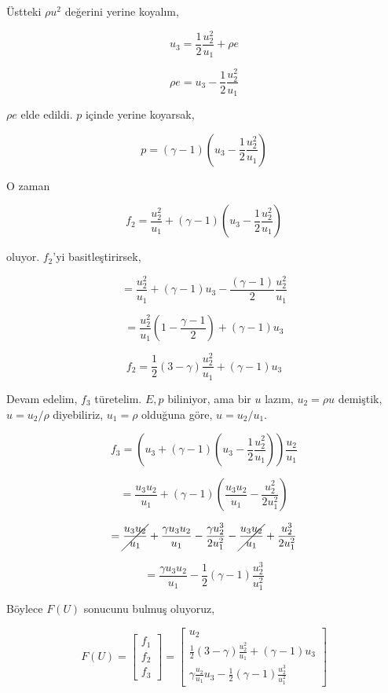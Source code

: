 \documentclass[12pt,fleqn]{article}\usepackage{../../common}
\begin{document}
Üstteki $\rho u^2$ değerini yerine koyalım,

$$
u_3 = \frac{1}{2} \frac{u_2^2}{u_1} + \rho e
$$

$$
\rho e = u_3 - \frac{1}{2} \frac{u_2^2}{u_1} 
$$

$\rho e$ elde edildi. $p$ içinde yerine koyarsak,

$$
p = (\gamma - 1) \left(  u_3 - \frac{1}{2} \frac{u_2^2}{u_1}   \right)
$$

O zaman

$$
f_2 = \frac{u_2^2}{u_1} +  (\gamma - 1) \left(  u_3 - \frac{1}{2} \frac{u_2^2}{u_1}   \right)
$$

oluyor. $f_2$'yi basitleştirirsek,

$$
= \frac{u_2^2}{u_1} + (\gamma - 1)u_3 - \frac{(\gamma-1)}{2} \frac{u_2^2}{u_1}
$$

$$
= \frac{u_2^2}{u_1} \left( 1 - \frac{\gamma-1}{2}  \right) + (\gamma - 1)u_3
$$

$$
f_2 = \frac{1}{2} (3-\gamma) \frac{u_2^2}{u_1} + (\gamma - 1)u_3
$$

Devam edelim, $f_3$ türetelim. $E,p$ biliniyor, ama bir $u$ lazım,
$u_2 = \rho u$ demiştik, $u = u_2 / \rho$ diyebiliriz, $u_1 = \rho$
olduğuna göre, $u = u_2 / u_1$.

$$
f_3 =  \left(
  u_3 + (\gamma - 1) ( u_3 - \frac{1}{2} \frac{u_2^2}{u_1})
\right) \frac{u_2}{u_1}
$$

$$
= \frac{u_3 u_2}{u_1} + (\gamma - 1) \left(
  \frac{u_3 u_2}{u_1} - \frac{u_2^2}{2u_1^2}
\right)
$$

$$
=
\cancel{\frac{u_3 u_2}{u_1}} +
\frac{\gamma u_3 u_2}{u_1} -
\frac{\gamma u_2^3}{2u_1^2} -
\cancel{\frac{u_3 u_2}{u_1}} +
\frac{u_2^3}{2 u_1^2}
$$

$$
= \frac{\gamma u_3 u_2}{u_1} - \frac{1}{2} (\gamma - 1) \frac{u_2^3}{u_1^2}
$$

Böylece $F(U)$ sonucunu bulmuş oluyoruz, 

$$
F(U) =
\left[\begin{array}{c}
f_1 \\ f_2  \\ f_3
\end{array}\right] =
\left[\begin{array}{c}
u_2 \\
\frac{1}{2} (3-\gamma) \frac{u_2^2}{u_1} + (\gamma - 1)u_3 \\
\gamma \frac{u_2}{u_1} u_3 - \frac{1}{2} (\gamma - 1)\frac{u_2^3}{u_1^2}
\end{array}\right] 
$$
\end{document}
